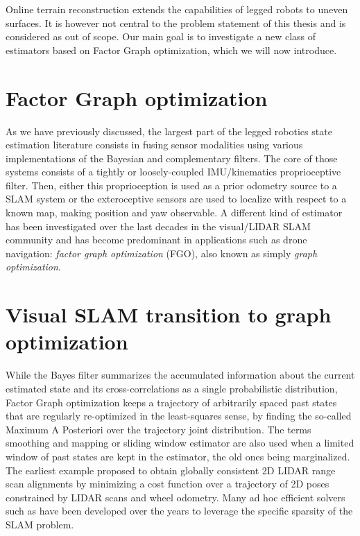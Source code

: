 Online terrain reconstruction extends the capabilities of legged robots to uneven surfaces. It is however not central to the problem statement of this thesis and is considered as
out of scope. Our main goal is to investigate a new class of estimators based on Factor Graph optimization, which we will now introduce. 


\section{Factor Graph optimization}
\label{sec:sota_factor_graph}
As we have previously discussed, the largest part of the legged robotics state estimation literature consists in fusing sensor modalities using various 
implementations of the Bayesian and complementary filters. The core of those systems consists of a tightly or loosely-coupled IMU/kinematics proprioceptive
filter. Then, either this proprioception is used as a prior odometry source to a SLAM system or the exteroceptive sensors are used to localize 
with respect to a known map, making position and yaw observable.
A different kind of estimator has been investigated over the last decades in the visual/LIDAR SLAM community and has become predominant in applications
such as drone navigation: \textit{factor graph optimization} (FGO), also known as simply \textit{graph optimization}. 

\section{Visual SLAM transition to graph optimization}

While the Bayes filter summarizes  the accumulated information about the current estimated state and its cross-correlations as a single probabilistic distribution, 
Factor Graph optimization keeps a trajectory of arbitrarily spaced past states that are regularly re-optimized in the least-squares sense, by finding the so-called 
Maximum A Posteriori over the trajectory joint distribution. The terms smoothing and mapping or sliding window estimator are also used when a limited window of past states are kept 
in the estimator, the old ones being marginalized. The earliest example \cite{lu1997globally} proposed to obtain globally consistent 2D LIDAR range 
scan alignments by minimizing a cost function over a trajectory of 2D poses constrained by LIDAR scans and wheel odometry.
 Many ad hoc efficient solvers such as \cite{grisetti2011g2o, dellaert2012factor, ila2017slam++, ceres-solver} have been developed 
over the years to leverage the specific sparsity of the SLAM problem.

